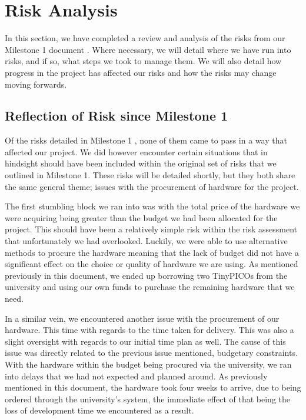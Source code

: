 \chapter{Risk Analysis} 
\label{sec:risk}

In this section, we have completed a review and analysis of the risks from our Milestone 1 document \cite{coaker}. Where necessary, we will detail where we have run into risks, and if so, what steps we took to manage them. We will also detail how progress in the project has affected our risks and how the risks may change moving forwards.

\section{Reflection of Risk since Milestone 1}

Of the risks detailed in Milestone 1 \cite{coaker}, none of them came to pass in a way that affected our project. We did however encounter certain situations that in hindsight should have been included within the original set of risks that we outlined in Milestone 1. These risks will be detailed shortly, but they both share the same general theme; issues with the procurement of hardware for the project. 

The first stumbling block we ran into was with the total price of the hardware we were acquiring being greater than the budget we had been allocated for the project. This should have been a relatively simple risk within the risk assessment that unfortunately we had overlooked. Luckily, we were able to use alternative methods to procure the hardware meaning that the lack of budget did not have a significant effect on the choice or quality of hardware we are using. As mentioned previously in this document, we ended up borrowing two TinyPICOs from the university and using our own funds to purchase the remaining hardware that we need. 

In a similar vein, we encountered another issue with the procurement of our hardware. This time with regards to the time taken for delivery. This was also a slight oversight with regards to our initial time plan as well. The cause of this issue was directly related to the previous issue mentioned, budgetary constraints. With the hardware within the budget being procured via the university, we ran into delays that we had not expected and planned around. As previously mentioned in this document, the hardware took four weeks to arrive, due to being ordered through the university's system, the immediate effect of that being the loss of development time we encountered as a result. 

